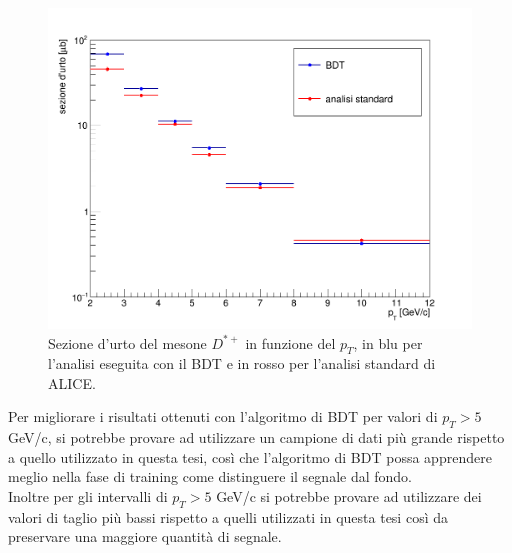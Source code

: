  \begin{figure}[htbp] 
        \centering
        \includegraphics[width=0.8\linewidth]{AnalisiDati/sezioneUrto.png}
        \caption{Sezione d'urto del mesone $D^{*+}$ in funzione del $p_T$, in blu per l'analisi eseguita con il BDT e in rosso per l'analisi standard di ALICE.}
        \label{fig:sezioneUrto}
    \end{figure}
   
    
Per migliorare i risultati ottenuti con l'algoritmo di BDT per valori di $p_T > 5$ GeV/c, si potrebbe provare ad utilizzare un campione di dati pi\`u grande rispetto a quello utilizzato in questa tesi, cos\`i che l'algoritmo di BDT possa apprendere meglio nella fase di training come distinguere il segnale dal fondo. 
\\Inoltre per gli intervalli di $p_T > 5$ GeV/c si potrebbe provare ad utilizzare dei valori di taglio pi\`u bassi rispetto a quelli utilizzati in questa tesi cos\`i da preservare una maggiore quantit\`a di segnale.
    

